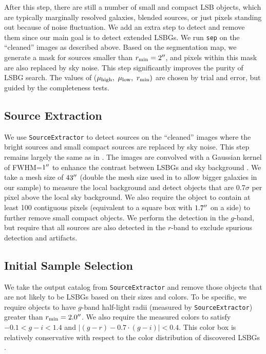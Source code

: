 \documentclass[twocolumn,astrosymb,twocolappendix]{aastex631}
\newcommand{\code}[1]{\texttt{#1}}
\begin{document}
\begin{CJK*}{UTF8}{gbsn}
After this step, there are still a number of small and compact LSB objects, which are typically marginally resolved galaxies, blended sources, or just pixels standing out because of noise fluctuation. We add an extra step to detect and remove them since our main goal is to detect extended LSBGs. We run \code{sep} on the ``cleaned'' images as described above. Based on the segmentation map, we generate a mask for sources smaller than $r_{\rm min} = 2\mbox{$^{\prime\prime}$}$, and pixels within this mask are also replaced by sky noise. This step significantly improves the purity of LSBG search. The values of ($\mu_{\rm high},\ \mu_{\rm low},\ r_{\rm min})$ are chosen by trial and error, but guided by the completeness tests. 
    
\subsection{Source Extraction}
We use \code{SourceExtractor} to detect sources on the ``cleaned'' images where the bright sources and small compact sources are replaced by sky noise. This step remains largely the same as in . The images are convolved with a Gaussian kernel of FWHM=$1\mbox{$^{\prime\prime}$}$ to enhance the contrast between LSBGs and sky background \citep[e.g.,][]{Irwin1985,Akhlaghi2015,Greco2018}. We take a mesh size of $43\mbox{$^{\prime\prime}$}$ (double the mesh size used in  to allow bigger galaxies in our sample) to measure the local background and detect objects that are 0.7$\sigma$ per pixel above the local sky background. We also require the object to contain at least 100 contiguous pixels (equivalent to a square box with $1.7\mbox{$^{\prime\prime}$}$ on a side) to further remove small compact objects. We perform the detection in the $g$-band, but require that all sources are also detected in the $r$-band to exclude spurious detection and artifacts.
    
\subsection{Initial Sample Selection} 
We take the output catalog from \code{SourceExtractor} and remove those objects that are not likely to be LSBGs based on their sizes and colors. To be specific, we require objects to have $g$-band half-light radii (measured by \code{SourceExtractor}) greater than $r_{\rm min} = 2.0\mbox{$^{\prime\prime}$}$. We also require the measured colors to satisfy $-0.1 < g-i < 1.4$ and $|(g-r) - 0.7\cdot (g-i)| < 0.4$. This color box is relatively conservative with respect to the color distribution of discovered LSBGs \citep[e.g.,][]{SAGA-I,Greco2018,Zaritsky2019,Tanoglidis2021}. 


\end{CJK*}
\end{document}
